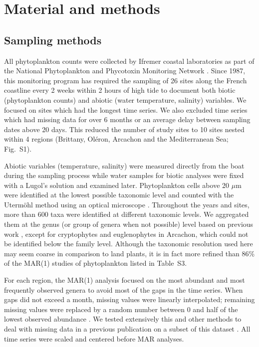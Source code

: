 \documentclass[10pt]{article}
\begin{document}
\section*{Material and methods}
\subsection*{Sampling methods}

All phytoplankton counts were collected by Ifremer coastal laboratories
as part of the National Phytoplankton and Phycotoxin Monitoring Network
\citep{REPHY_db}. Since 1987, this monitoring program
has required the sampling of 26 sites along the French coastline every
2 weeks within 2 hours of high tide to document both biotic (phytoplankton
counts) and abiotic (water temperature, salinity) variables. We focused
on sites which had the longest time series. We also excluded time
series which had missing data for over 6 months or an average delay
between sampling dates above 20 days. This reduced the number of study
sites to 10 sites nested within 4 regions (Brittany, Oléron, Arcachon
and the Mediterranean Sea; Fig.~S1).

Abiotic variables (temperature, salinity) were measured directly from
the boat during the sampling process while water samples for biotic
analyses were fixed with a Lugol's solution and examined later. Phytoplankton
cells above 20 $\mu$m were identified at the lowest possible
taxonomic level and counted with the Utermöhl method using an optical
microscope \citep{utermohl_zur_1958}. Throughout the years and
sites, more than 600 taxa were identified at different taxonomic levels.
We aggregated them at the genus (or group of genera when not possible)
level based on previous work \citep{hernandez_farinas_assessing_2015,barraquand_coastal_2018},
except for cryptophytes and euglenophytes in Arcachon, which could
not be identified below the family level. Although the taxonomic resolution
used here may seem coarse in comparison to land plants, it is in fact
more refined than 86\% of the MAR(1) studies of phytoplankton listed
in Table~S3.

For each region, the MAR(1) analysis focused on the most abundant
and most frequently observed genera to avoid most of the gaps in the
time series. When gaps did not exceed a month, missing values were
linearly interpolated; remaining missing values were replaced by a
random number between 0 and half of the lowest observed abundance \citep{hampton_coalescence_2006}. We tested extensively this
and other methods to deal with missing data in a previous publication
on a subset of this dataset \citep{barraquand_coastal_2018}.
All time series were scaled and centered before MAR analyses.
\end{document}
